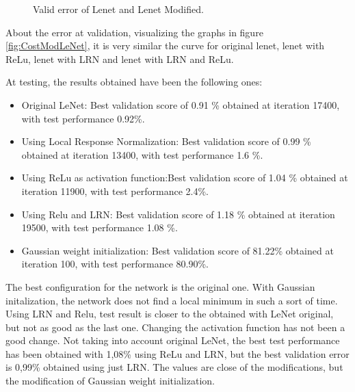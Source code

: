 \begin{figure}[htb]
    \caption{Valid error of Lenet and Lenet Modified.} \label{fig:ErrorModLeNet}
\end{figure}

About the error at validation, visualizing the graphs in figure \ref{fig:CostModLeNet}, it is very similar the curve for original lenet, lenet with ReLu, lenet with LRN and lenet with LRN and ReLu.

At testing, the results obtained have been the following ones:

\begin{itemize}
\item{Original LeNet}: Best validation score of 0.91 \% obtained at iteration 17400, with test performance 0.92\%.
\item{Using Local Response Normalization}: Best validation score of 0.99 \% obtained at iteration 13400, with test performance 1.6 \%.
\item{Using ReLu as activation function}:Best validation score of 1.04 \% obtained at iteration 11900, with test performance 2.4\%.
\item{Using Relu and LRN}: Best validation score of 1.18 \% obtained at iteration 19500, with test performance 1.08 \%.
\item{Gaussian weight initialization}: Best validation score of 81.22\% obtained at iteration 100, with test performance 80.90\%.
\end{itemize}

The best configuration for the network is the original one. With Gaussian initalization, the network does not find a local minimum in such a sort of time. Using LRN and Relu, test result is closer to the obtained with LeNet original, but not as good as the last one. Changing the activation function has not been a good change. Not taking into account original LeNet, the best test performance has been obtained with 1,08\% using ReLu and LRN, but the best validation error is 0,99\% obtained using just LRN. The values are close of the modifications, but the modification of Gaussian weight initialization.\\

